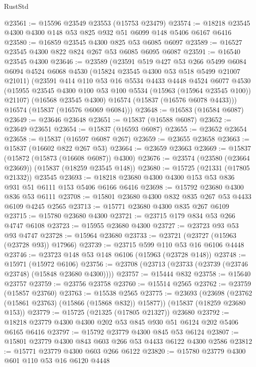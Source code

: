 \begin{lexlean}{RustStd}
\begin{coremodule}
@23561 := @15596 @23549 @23553 (@15753 @23479)
@23574 := @18218 @23545 @4300 @4300 @148 @53 @825 @932 @51 @6099 @148 @5406 @6167 @6416
@23580 := @16859 @23545 @4300 @825 @53 @6085 @6097
@23589 := @16527 @23545 @4300 @822 @824 @267 @53 @6085 @6095 @6087
@23591 := @16540 @23545 @4300
@23646 := @23589
    (@23591
      @519
      @427
      @53
      @266
      @5499
      @6084
      @6094
      @4524
      @6068
      @4530
      (@15824 @23545 @4300 @53 @518 @5499 @21007 @21011)
      (@23591
        @414
        @110
        @53
        @16
        @5534
        @4433
        @4448
        @4524
        @6077
        @4530
        (@15955 @23545 @4300 @100 @53 @100 @5534 (@15963 (@15964 @23545 @100)) @21107)
        (@16568 @23545 @4300)
        @16574
        (@15837 (@16576 @6078 @4433)))
      @16574
      (@15837 (@16576 @6069 @6084)))
@23648 := @16583 (@16584 @6087)
@23649 := @23646 @23648
@23651 := @15837 (@16588 @6087)
@23652 := @23649 @23651
@23654 := @15837 (@16593 @6087)
@23655 := @23652 @23654
@23658 := @15837 (@16597 @6087 @267)
@23659 := @23655 @23658
@23663 := @15837 (@16602 @822 @267 @53)
@23664 := @23659 @23663
@23669 := @15837 (@15872 (@15873 (@16608 @6087)) @4300)
@23676 := @23574 (@23580 (@23664 @23669)) (@15837 (@18259 @23545 @148))
@23680 := @15725 (@21331 (@17805 @21332)) @23545
@23693 := @18218 @23680 @4300 @4300 @153 @53 @836 @931 @51 @6111 @153 @5406 @6166 @6416
@23698 := @15792 @23680 @4300 @836 @53 @6111
@23708 := @15801 @23680 @4300 @832 @835 @267 @53 @4433 @6109 @4245 @2565
@23713 := @15771 @23680 @4300 @835 @267 @6109
@23715 := @15780 @23680 @4300
@23721 := @23715 @179 @834 @53 @266 @4747 @6108
@23723 := @15955 @23680 @4300
@23727 := @23723 @93 @53 @93 @4747
@23728 := @15964 @23680
@23733 := @23721 (@23727 (@15963 (@23728 @93)) @17966)
@23739 := @23715 @599 @110 @53 @16 @6106 @4448
@23746 := @23723 @148 @53 @148 @6106 (@15963 (@23728 @148))
@23748 := @15971 (@15972 @6106)
@23756 := @23708 (@23713 (@23733 (@23739 (@23746 @23748) (@15848 @23680 @4300))))
@23757 := @15444 @832
@23758 := @15640 @23757
@23759 := @23756 @23758
@23760 := @15514 @2565
@23762 := @23759 (@15857 @23760)
@23763 := @15538 @2565
@23775 := @23693
    (@23698 (@23762 (@15861 @23763) (@15866 (@15868 @832)) @15877))
    (@15837 (@18259 @23680 @153))
@23779 := @15725 (@21325 (@17805 @21327)) @23680
@23792 := @18218 @23779 @4300 @4300 @202 @53 @845 @930 @51 @6124 @202 @5406 @6165 @6416
@23797 := @15792 @23779 @4300 @845 @53 @6124
@23807 := @15801 @23779 @4300 @843 @603 @266 @53 @4433 @6122 @4300 @2586
@23812 := @15771 @23779 @4300 @603 @266 @6122
@23820 := @15780 @23779 @4300 @601 @110 @53 @16 @6120 @4448

\end{coremodule}
\end{lexlean}
